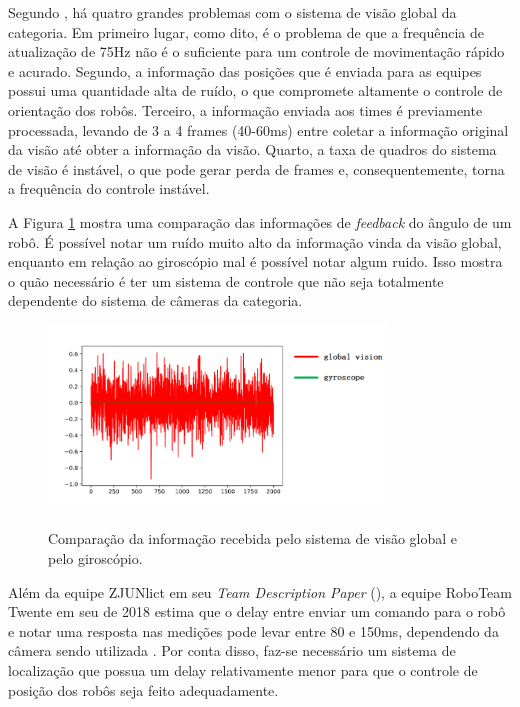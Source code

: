 \documentclass[acronym, symbols, table]{fei}
\begin{document}
			Segundo \textcite{tdpZJUNlict2020}, há quatro grandes problemas com o sistema de visão global da categoria. Em primeiro lugar, como dito, é o problema de que a frequência de atualização de 75Hz não é o suficiente para um controle de movimentação rápido e acurado. Segundo, a informação das posições que é enviada para as equipes possui uma quantidade alta de ruído, o que compromete altamente o controle de orientação dos robôs. Terceiro, a informação enviada aos times é previamente processada, levando de 3 a 4 frames (40-60ms) entre coletar a informação original da visão até obter a informação da visão. Quarto, a taxa de quadros do sistema de visão é instável, o que pode gerar perda de frames e, consequentemente, torna a frequência do controle instável.
			
			A Figura \ref{fig:comparison_cameras_gyroscope} mostra uma comparação das informações de \textit{feedback} do ângulo de um robô. É possível notar um ruído muito alto da informação vinda da visão global, enquanto em relação ao giroscópio mal é possível notar algum ruido. Isso mostra o quão necessário é ter um sistema de controle que não seja totalmente dependente do sistema de câmeras da categoria.
			
			\begin{figure}[!htb]
					\centering
					\caption{Comparação da informação recebida pelo sistema de visão global e pelo giroscópio.} 
					\includegraphics[width=0.8\textwidth]{Comparacao_cameras_giroscopio.png}
					\label{fig:comparison_cameras_gyroscope}
				\end{figure}
		
			Além da equipe ZJUNlict em seu \textit{Team Description Paper} (), a equipe RoboTeam Twente em seu  de 2018 estima que o delay entre enviar um comando para o robô e notar uma resposta nas medições pode levar entre 80 e 150ms, dependendo da câmera sendo utilizada \cite{tdptwente2018}. Por conta disso, faz-se necessário um sistema de localização que possua um delay relativamente menor para que o controle de posição dos robôs seja feito adequadamente.
			
\end{document}
